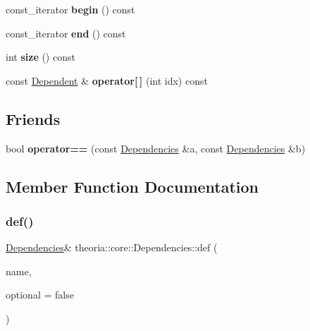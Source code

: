 \begin{DoxyCompactItemize}
const\+\_\+iterator {\bfseries begin} () const
\item 
\mbox{\label{classtheoria_1_1core_1_1Dependencies_ae1acd1d0962abda73cb1a46447dd4a5e}} 
const\+\_\+iterator {\bfseries end} () const
\item 
\mbox{\label{classtheoria_1_1core_1_1Dependencies_a5d099bcbccf7ae14e5a373aa6be82288}} 
int {\bfseries size} () const
\item 
\mbox{\label{classtheoria_1_1core_1_1Dependencies_afba2a36945b9320b793ff8f3350ce468}} 
const \hyperlink{structtheoria_1_1core_1_1Dependencies_1_1Dependent}{Dependent} \& {\bfseries operator\mbox{[}$\,$\mbox{]}} (int idx) const
\end{DoxyCompactItemize}
\subsection*{Friends}
\begin{DoxyCompactItemize}
\item 
\mbox{\label{classtheoria_1_1core_1_1Dependencies_a3fef4fe6d625d0698807b631fa90db4b}} 
bool {\bfseries operator==} (const \hyperlink{classtheoria_1_1core_1_1Dependencies}{Dependencies} \&a, const \hyperlink{classtheoria_1_1core_1_1Dependencies}{Dependencies} \&b)
\end{DoxyCompactItemize}


\subsection{Member Function Documentation}
\mbox{\label{classtheoria_1_1core_1_1Dependencies_ae3995847906cda98292e0a9215797d41}} 
\subsubsection{\texorpdfstring{def()}{def()}}
{\footnotesize\ttfamily \hyperlink{classtheoria_1_1core_1_1Dependencies}{Dependencies}\& theoria\+::core\+::\+Dependencies\+::def (\begin{DoxyParamCaption}\item[{const Type\+Name \&}]{name,  }\item[{bool}]{optional = {\ttfamily false} }\end{DoxyParamCaption})\hspace{0.3cm}{\ttfamily [inline]}}

